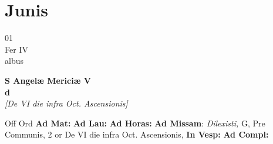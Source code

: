 \documentclass[10pt, openany]{book}
\begin{document}
        \chapter{Junis}
                        
        \begin{center}
            \begin{minipage}{3.5in}
                \vspace{2em}
                \begin{minipage}{0.5in}
                    {\Huge 01} \\
                    {\normalsize Fer IV} \\
                    {\normalsize albus}
                \end{minipage}
                \begin{minipage}{3.0in}
                    \textbf{ \large S Angelæ Mericiæ V \\
                    \textnormal{\normalsize d}} \\ \textit{[De VI die infra Oct. Ascensionis]} \\ 
                \end{minipage}
                \begin{justify}Off Ord
                    \textbf{Ad Mat: }
                    \textbf{Ad Lau: }
                    \textbf{Ad Horas: }\textbf{Ad Missam}: \textit{Dilexisti,} G, Pre Communis, 2 or De VI die infra Oct. Ascensionis,  
                    \textbf{In Vesp: }
                    \textbf{Ad Compl: }
                \end{justify}
            \end{minipage}
        \end{center}
    
\end{document}
